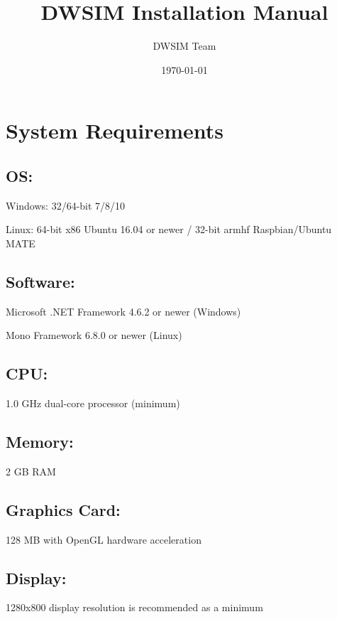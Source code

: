 \documentclass[12pt,a4paper]{article}
\begin{document}
\title{DWSIM Installation Manual}
\author{DWSIM Team}
\date{\today}

\maketitle

\section*{System Requirements}

\subsection*{OS:}

Windows: 32/64-bit 7/8/10

\noindent Linux: 64-bit x86 Ubuntu 16.04 or newer / 32-bit armhf Raspbian/Ubuntu MATE

\subsection*{Software:}

Microsoft .NET Framework 4.6.2 or newer (Windows) 

\noindent Mono Framework 6.8.0 or newer (Linux)

\subsection*{CPU:}
1.0 GHz dual-core processor (minimum)

\subsection*{Memory:}         

2 GB RAM

\subsection*{Graphics Card:}	

128 MB with OpenGL hardware acceleration

\subsection*{Display:}    

1280x800 display resolution is recommended as a minimum
\end{document}
